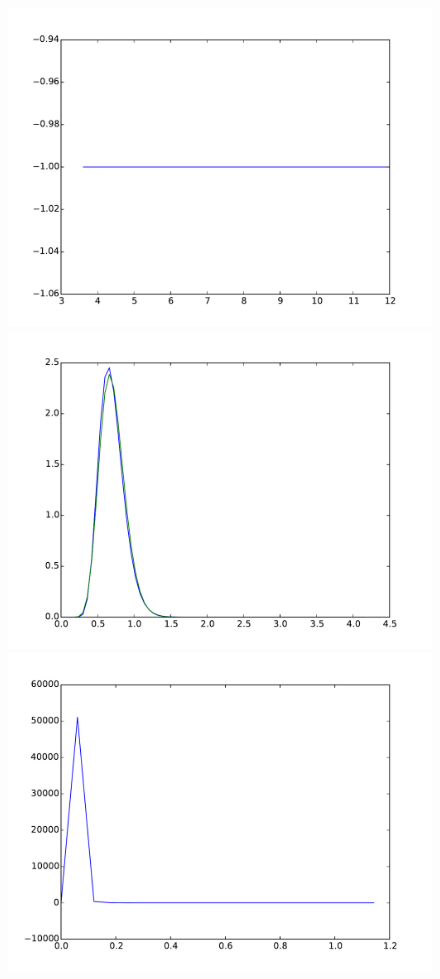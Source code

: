\documentclass{article}
\begin{document}
\begin{figure}[htb]
\begin{minipage}{.3\textwidth}
		\includegraphics[width=0.97\linewidth]{bootstrap-filter/relative_tail_simple_1_3.pdf}
	\end{minipage}
	\begin{minipage}{.3\textwidth}
		\centering
		\includegraphics[width=0.97\linewidth]{bootstrap-filter/global_simple_3_1.pdf}
	\end{minipage}
	\begin{minipage}{.3\textwidth}
		\centering
		\includegraphics[width=0.97\linewidth]{bootstrap-filter/relative_beginning_simple_4_3.pdf}

\end{minipage}
\end{figure}
\end{document}

